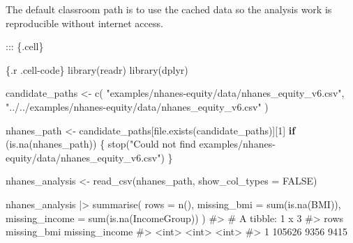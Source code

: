 \documentclass[
  letterpaper,
  DIV=11,
  numbers=noendperiod,
  oneside]{scrreprt}
\newenvironment{Shaded}{\begin{snugshade}}{\end{snugshade}}
\newcommand{\AttributeTok}[1]{\textcolor[rgb]{0.40,0.45,0.13}{#1}}
\newcommand{\CommentTok}[1]{\textcolor[rgb]{0.37,0.37,0.37}{#1}}
\newcommand{\ConstantTok}[1]{\textcolor[rgb]{0.56,0.35,0.01}{#1}}
\newcommand{\ControlFlowTok}[1]{\textcolor[rgb]{0.00,0.23,0.31}{\textbf{#1}}}
\newcommand{\DecValTok}[1]{\textcolor[rgb]{0.68,0.00,0.00}{#1}}
\newcommand{\FunctionTok}[1]{\textcolor[rgb]{0.28,0.35,0.67}{#1}}
\newcommand{\InformationTok}[1]{\textcolor[rgb]{0.37,0.37,0.37}{#1}}
\newcommand{\NormalTok}[1]{\textcolor[rgb]{0.00,0.23,0.31}{#1}}
\newcommand{\OtherTok}[1]{\textcolor[rgb]{0.00,0.23,0.31}{#1}}
\newcommand{\SpecialCharTok}[1]{\textcolor[rgb]{0.37,0.37,0.37}{#1}}
\newcommand{\StringTok}[1]{\textcolor[rgb]{0.13,0.47,0.30}{#1}}
\begin{document}
\begin{Shaded}
\begin{Highlighting}[numbers=left,,]
\NormalTok{The default classroom path is to use the cached data so the analysis work is reproducible without internet access.}


\NormalTok{::: \{.cell\}}

\InformationTok{\textasciigrave{}\textasciigrave{}\textasciigrave{}\{.r .cell{-}code\}}
\FunctionTok{library}\NormalTok{(readr)}
\FunctionTok{library}\NormalTok{(dplyr)}

\NormalTok{candidate\_paths }\OtherTok{\textless{}{-}} \FunctionTok{c}\NormalTok{(}
  \StringTok{"examples/nhanes{-}equity/data/nhanes\_equity\_v6.csv"}\NormalTok{,}
  \StringTok{"../../examples/nhanes{-}equity/data/nhanes\_equity\_v6.csv"}
\NormalTok{)}

\NormalTok{nhanes\_path }\OtherTok{\textless{}{-}}\NormalTok{ candidate\_paths[}\FunctionTok{file.exists}\NormalTok{(candidate\_paths)][}\DecValTok{1}\NormalTok{]}
\ControlFlowTok{if}\NormalTok{ (}\FunctionTok{is.na}\NormalTok{(nhanes\_path)) \{}
  \FunctionTok{stop}\NormalTok{(}\StringTok{"Could not find examples/nhanes{-}equity/data/nhanes\_equity\_v6.csv"}\NormalTok{)}
\NormalTok{\}}

\NormalTok{nhanes\_analysis }\OtherTok{\textless{}{-}} \FunctionTok{read\_csv}\NormalTok{(nhanes\_path, }\AttributeTok{show\_col\_types =} \ConstantTok{FALSE}\NormalTok{)}

\NormalTok{nhanes\_analysis }\SpecialCharTok{|\textgreater{}}
  \FunctionTok{summarise}\NormalTok{(}
    \AttributeTok{rows =} \FunctionTok{n}\NormalTok{(),}
    \AttributeTok{missing\_bmi =} \FunctionTok{sum}\NormalTok{(}\FunctionTok{is.na}\NormalTok{(BMI)),}
    \AttributeTok{missing\_income =} \FunctionTok{sum}\NormalTok{(}\FunctionTok{is.na}\NormalTok{(IncomeGroup))}
\NormalTok{  )}
\CommentTok{\#\textgreater{} \# A tibble: 1 x 3}
\CommentTok{\#\textgreater{}     rows missing\_bmi missing\_income}
\CommentTok{\#\textgreater{}    \textless{}int\textgreater{}       \textless{}int\textgreater{}          \textless{}int\textgreater{}}
\CommentTok{\#\textgreater{} 1 105626        9356           9415}


\end{Highlighting}
\end{Shaded}
\end{document}
